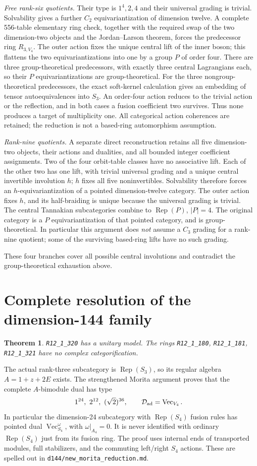 \documentclass[11pt]{article}
\newtheorem{theorem}{Theorem}
\newcommand{\R}[1]{\texttt{R12\_1\_#1}}
\renewcommand{\Vec}{\operatorname{Vec}}
\newcommand{\Rep}{\operatorname{Rep}}
\begin{document}
\emph{Free rank-six quotients.} Their type is $1^4,2,4$ and their universal
grading is trivial. Solvability gives a further $C_2$ equivariantization
of dimension twelve. A complete 556-table elementary ring check, together
with the required swap of the two dimension-two objects and the
Jordan--Larson theorem, forces the predecessor ring $R_{3,V_4}$.
The outer action fixes the unique central lift of the inner boson; this
flattens the two equivariantizations into one by a group $P$ of order four.
There are three group-theoretical predecessors, with exactly three central
Lagrangians each, so their $P$ equivariantizations are group-theoretical.
For the three nongroup-theoretical predecessors, the exact soft-kernel
calculation gives an embedding of tensor autoequivalences into $S_3$.
An order-four action reduces to the trivial action or the reflection,
and in both cases a fusion coefficient two survives. Thus none produces
a target of multiplicity one. All categorical action coherences are
retained; the reduction is not a based-ring automorphism assumption.

\emph{Rank-nine quotients.} A separate direct reconstruction retains all
five dimension-two objects, their actions and dualities, and all bounded
integer coefficient assignments. Two of the four orbit-table classes
have no associative lift. Each of the other two has one lift, with
trivial universal grading and a unique central invertible involution $h$;
$h$ fixes all five noninvertibles. Solvability therefore forces an
$h$-equivariantization of a pointed dimension-twelve category. The outer
action fixes $h$, and its half-braiding is unique because the universal
grading is trivial. The central Tannakian subcategories combine to
$\Rep(P)$, $|P|=4$. The original category is a $P$ equivariantization
of that pointed category, and is group-theoretical. In particular this
argument does \emph{not} assume a $C_3$ grading for a rank-nine quotient;
some of the surviving based-ring lifts have no such grading.

These four branches cover all possible central involutions and contradict
the group-theoretical exhaustion above.

\section{Complete resolution of the dimension-144 family}
\begin{theorem}
\R{320} has a unitary model. The rings \R{180}, \R{181}, \R{321}
have no complex categorification.
\end{theorem}
The actual rank-three subcategory is $\Rep(S_3)$, so its regular algebra
$A=1+z+2E$ exists. The strengthened Morita argument proves that the
complete $A$-bimodule dual has type
\[
 1^{24},\ 2^{12},\ (\sqrt2)^{36},\qquad
 \mathcal D_{\rm ad}=\Vec_{V_4}.
\]
In particular the dimension-24 subcategory with $\Rep(S_4)$ fusion rules
has pointed dual $\Vec_{S_4}^{\omega}$, with $\omega|_{A_4}=0$.
It is never identified with ordinary $\Rep(S_4)$ just from its fusion ring.
The proof uses internal ends of transported modules, full stabilizers,
and the commuting left/right $S_4$ actions. These are spelled out in
\texttt{d144/new\_morita\_reduction.md}.
\end{document}
